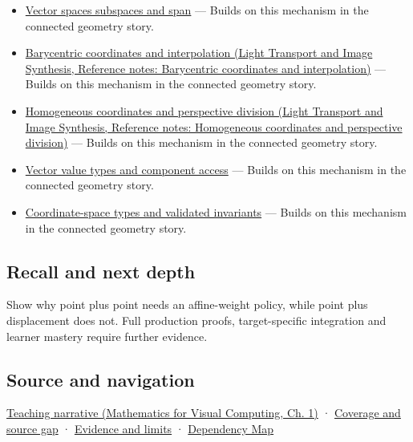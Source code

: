 \begin{itemize}
\tightlist
\item
  \hyperref[appendix-173b52c063ae]{Vector spaces subspaces and span} --- Builds on this mechanism in the connected geometry story.
\item
  \href{../04-Light-Transport-and-Image-Synthesis/main.pdf\#nameddest=appendix-02b9d9a81dca}{Barycentric coordinates and interpolation (Light Transport and Image Synthesis, Reference notes: Barycentric coordinates and interpolation)} --- Builds on this mechanism in the connected geometry story.
\item
  \href{../04-Light-Transport-and-Image-Synthesis/main.pdf\#nameddest=appendix-cb3b26862282}{Homogeneous coordinates and perspective division (Light Transport and Image Synthesis, Reference notes: Homogeneous coordinates and perspective division)} --- Builds on this mechanism in the connected geometry story.
\item
  \hyperref[appendix-37a39984ba66]{Vector value types and component access} --- Builds on this mechanism in the connected geometry story.
\item
  \hyperref[appendix-380a220e2529]{Coordinate-space types and validated invariants} --- Builds on this mechanism in the connected geometry story.
\end{itemize}

\subsection{Recall and next depth}\label{appendix-0659864c0aa3-recall-and-next-depth}

Show why point plus point needs an affine-weight policy, while point plus displacement does not. Full production proofs, target-specific integration and learner mastery require further evidence.

\subsection{Source and navigation}\label{appendix-0659864c0aa3-source-and-navigation}

\href{../02-Mathematics-for-Visual-Computing/main.pdf\#nameddest=01-foundations-i-ch017-an-arrow-is-not-the-address-written-beside-it}{Teaching narrative (Mathematics for Visual Computing, Ch. 1)} · \hyperref[appendix-fd090d982a15-phase-6---parts-501-600]{Coverage and source gap} · \hyperref[appendix-a103e7846d21-phase-6---source-analysis-and-verification]{Evidence and limits} · \hyperref[appendix-4ad47bdd269a]{Dependency Map}
